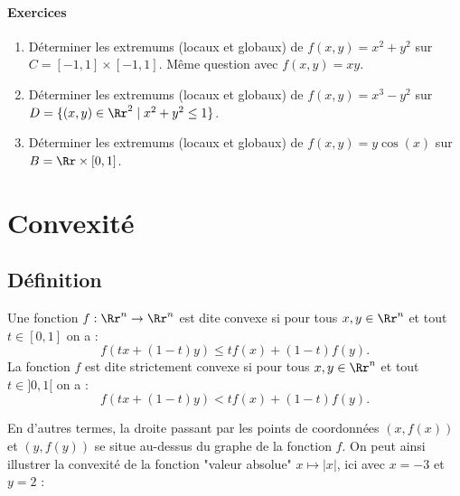 \paragraph{Exercices}
    \begin{enumerate}
        \item Déterminer les extremums (locaux et globaux) de $f(x,y) = x^2+y^2$ sur $C = [-1,1] \times [-1,1]$. Même question avec $f(x,y)= xy$.

        \item Déterminer les extremums (locaux et globaux) de $f(x,y) = x^3-y^2$ sur $D = \lbrace (x,y) \in \Rr^2  \mid  x^2 + y^2 \leq 1 \rbrace$.

        \item Déterminer les extremums (locaux et globaux) de $f(x,y) = y\cos(x)$ sur $B = \Rr \times [0,1]$.
    \end{enumerate}





\section{Convexité}


\subsection{Définition}

\begin{definition}{}{}
	Une fonction $f : \Rr^n \to \Rr^n$ est dite convexe si pour tous $x,y \in \Rr^n$ et tout $t \in [0,1]$ on a : $$f(tx+(1-t)y) \le t f(x) + (1-t) f(y).$$ La fonction $f$ est dite strictement convexe si pour tous $x,y \in \Rr^n$ et tout $t \in ]0,1[$ on a : $$f(tx+(1-t)y) < t f(x) + (1-t) f(y).$$
\end{definition}

En d'autres termes, la droite passant par les points de coordonnées $(x,f(x))$ et $(y,f(y))$ se situe au-dessus du graphe de la fonction $f$. On peut ainsi illustrer la convexité de la fonction "valeur absolue" $x \mapsto |x|$, ici avec $x=-3$ et $y=2$ : 

\bigskip

\begin{center}
\end{center}

